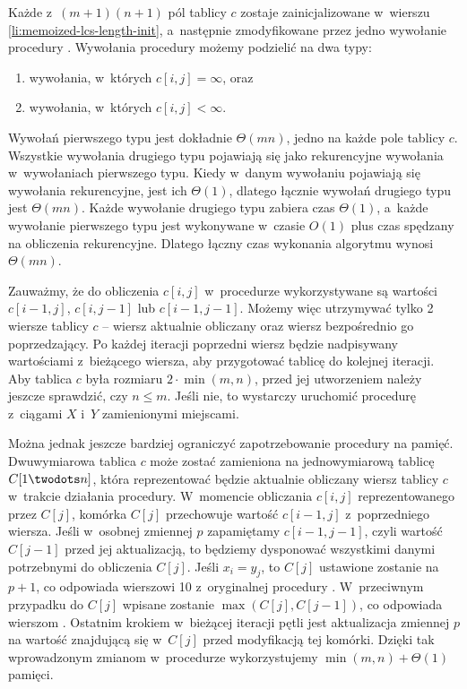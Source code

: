 Każde z~$(m+1)(n+1)$ pól tablicy $c$ zostaje zainicjalizowane w~wierszu \ref{li:memoized-lcs-length-init}, a~następnie zmodyfikowane przez jedno wywołanie procedury .
Wywołania procedury  możemy podzielić na dwa typy:
\begin{enumerate}
	\item wywołania, w~których $c[i,j]=\infty$, oraz
	\item wywołania, w~których $c[i,j]<\infty$.
\end{enumerate}
Wywołań pierwszego typu jest dokładnie $\Theta(mn)$, jedno na każde pole tablicy $c$.
Wszystkie wywołania drugiego typu pojawiają się jako rekurencyjne wywołania w~wywołaniach pierwszego typu.
Kiedy w~danym wywołaniu  pojawiają się wywołania rekurencyjne, jest ich $\Theta(1)$, dlatego łącznie wywołań drugiego typu jest $\Theta(mn)$.
Każde wywołanie drugiego typu zabiera czas $\Theta(1)$, a~każde wywołanie pierwszego typu jest wykonywane w~czasie $O(1)$ plus czas spędzany na obliczenia rekurencyjne.
Dlatego łączny czas wykonania algorytmu  wynosi $\Theta(mn)$.

\exercise %
Zauważmy, że do obliczenia $c[i,j]$ w~procedurze  wykorzystywane są wartości $c[i-1,j]$, $c[i,j-1]$ lub $c[i-1,j-1]$.
Możemy więc utrzymywać tylko 2 wiersze tablicy $c$ -- wiersz aktualnie obliczany oraz wiersz bezpośrednio go poprzedzający.
Po każdej iteracji poprzedni wiersz będzie nadpisywany wartościami z~bieżącego wiersza, aby przygotować tablicę do kolejnej iteracji.
Aby tablica $c$ była rozmiaru $2\cdot\min(m,n)$, przed jej utworzeniem należy jeszcze sprawdzić, czy $n\le m$.
Jeśli nie, to wystarczy uruchomić procedurę z~ciągami $X$ i~$Y$ zamienionymi miejscami.

Można jednak jeszcze bardziej ograniczyć zapotrzebowanie procedury na pamięć.
Dwuwymiarowa tablica $c$ może zostać zamieniona na jednowymiarową tablicę $C[1\twodots n]$, która reprezentować będzie aktualnie obliczany wiersz tablicy $c$ w~trakcie działania procedury.
W~momencie obliczania $c[i,j]$ reprezentowanego przez $C[j]$, komórka $C[j]$ przechowuje wartość $c[i-1,j]$ z~poprzedniego wiersza.
Jeśli w~osobnej zmiennej $p$ zapamiętamy $c[i-1,j-1]$, czyli wartość $C[j-1]$ przed jej aktualizacją, to będziemy dysponować wszystkimi danymi potrzebnymi do obliczenia $C[j]$.
Jeśli $x_i=y_j$, to $C[j]$ ustawione zostanie na $p+1$, co odpowiada wierszowi 10 z~oryginalnej procedury .
W~przeciwnym przypadku do $C[j]$ wpisane zostanie $\max(C[j],C[j-1])$, co odpowiada wierszom .
Ostatnim krokiem w~bieżącej iteracji pętli jest aktualizacja zmiennej $p$ na wartość znajdującą się w~$C[j]$ przed modyfikacją tej komórki.
Dzięki tak wprowadzonym zmianom w~procedurze wykorzystujemy $\min(m,n)+\Theta(1)$ pamięci.

\exercise %


\exercise %
